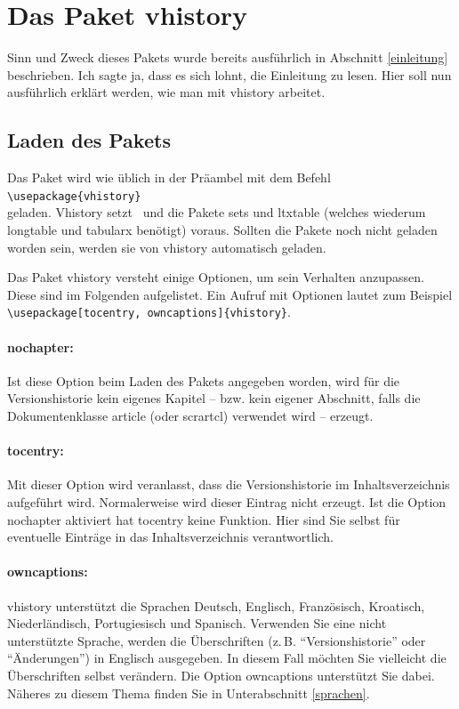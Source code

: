 \section{Das Paket vhistory}
Sinn und Zweck dieses Pakets wurde bereits ausführlich in Abschnitt \ref{einleitung} beschrieben. Ich sagte ja, dass es sich lohnt, die Einleitung zu lesen. Hier soll nun ausführlich erklärt werden, wie man mit vhistory arbeitet.

\subsection{Laden des Pakets}\label{laden}
Das Paket wird wie üblich in der Präambel mit dem Befehl\\
\mbox{}\hspace{2em}\verb|\usepackage{vhistory}|\\
geladen. Vhistory setzt \LaTeXe\ und die Pakete sets und ltxtable (welches wiederum longtable und tabularx benötigt) voraus. Sollten die Pakete noch nicht geladen worden sein, werden sie von vhistory automatisch geladen.

Das Paket vhistory versteht einige Optionen, um sein Verhalten anzupassen. Diese sind im Folgenden aufgelistet. Ein Aufruf mit Optionen lautet zum Beispiel\\
\mbox{}\hspace{2em}\verb|\usepackage[tocentry, owncaptions]{vhistory}|.

\paragraph{nochapter:} Ist diese Option beim Laden des Pakets angegeben worden, wird für die Versionshistorie kein eigenes Kapitel -- bzw. kein eigener Abschnitt, falls die Dokumentenklasse article (oder scrartcl) verwendet wird -- erzeugt.

\paragraph{tocentry:} Mit dieser Option wird veranlasst, dass die Versionshistorie im Inhaltsverzeichnis aufgeführt wird. Normalerweise wird dieser Eintrag nicht erzeugt. Ist die Option nochapter aktiviert hat tocentry keine Funktion. Hier sind Sie selbst für eventuelle Einträge in das Inhaltsverzeichnis verantwortlich.

\paragraph{owncaptions:} vhistory unterstützt die Sprachen Deutsch, Englisch, Französisch, Kroatisch, Niederländisch, Portugiesisch und Spanisch. Verwenden Sie eine nicht unterstützte Sprache, werden die Überschriften (z.\,B. "`Versionshistorie"' oder "`Änderungen"') in Englisch ausgegeben. In diesem Fall möchten Sie vielleicht die Überschriften selbst verändern. Die Option own\-capt\-ions unterstützt Sie dabei. Näheres zu diesem Thema finden Sie in Unterabschnitt \ref{sprachen}.

